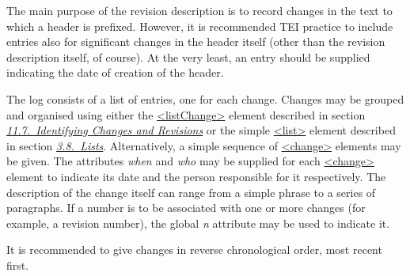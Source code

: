The main purpose of the revision description is to record changes in the text to which a header is prefixed. However, it is recommended TEI practice to include entries also for significant changes in the header itself (other than the revision description itself, of course). At the very least, an entry should be supplied indicating the date of creation of the header.\par
The log consists of a list of entries, one for each change. Changes may be grouped and organised using either the \hyperref[TEI.listChange]{<listChange>} element described in section \textit{\hyperref[PH-changes]{11.7.\ Identifying Changes and Revisions}} or the simple \hyperref[TEI.list]{<list>} element described in section \textit{\hyperref[COLI]{3.8.\ Lists}}. Alternatively, a simple sequence of \hyperref[TEI.change]{<change>} elements may be given. The attributes {\itshape when} and {\itshape who} may be supplied for each \hyperref[TEI.change]{<change>} element to indicate its date and the person responsible for it respectively. The description of the change itself can range from a simple phrase to a series of paragraphs. If a number is to be associated with one or more changes (for example, a revision number), the global {\itshape n} attribute may be used to indicate it.\par
It is recommended to give changes in reverse chronological order, most recent first.\par
